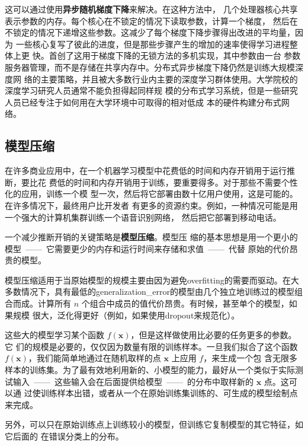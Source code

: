 这可以通过使用\textbf{异步随机梯度下降}\citep{NIPS2011_4390}来解决。在这种方法中，
几个处理器核心共享表示参数的内存。每个核心在不锁定的情况下读取参数，计算一个梯度，
然后在不锁定的情况下递增这些参数。这减少了每个梯度下降步骤得出改进的平均量，因为
一些核心复写了彼此的进度，但是那些步骤产生的增加的速率使得学习进程整体上更
快。\citet{NIPS2012_4687}首创了这用于梯度下降的无锁方法的多机实现，其中参数由一台
参数服务器管理，而不是存储在共享内存中。分布式异步梯度下降仍然是训练大规模深度网
络的主要策略，并且被大多数行业内主要的深度学习群体使用\citep{186212,
  DBLP:journals/corr/WuYSDS15}。大学院校的深度学习研究人员通常不能负担得起同样规
模的分布式学习系统，但是一些研究人员已经专注于如何用在大学环境中可取得的相对低成
本的硬件构建分布式网络\citep{coates2013deep}。

\subsection{模型压缩}
\label{subsec:model_compression}

在许多商业应用中，在一个机器学习模型中花费低的时间和内存开销用于运行推断，要比花
费低的时间和内存开销用于训练，要重要得多。对于那些不需要个性化的应用，训练一个模
型一次，然后将它部署由数十亿用户使用，这是可能的。在许多情况下，最终用户比开发者
有更多的资源约束。例如，一种情况可能是用一个强大的计算机集群训练一个语音识别网络，
然后把它部署到移动电话。

一个减少推断开销的关键策略是\textbf{模型压缩}\citep{Ungar:2006:1150402}。模型压
缩的基本思想是用一个更小的模型~——~它需要更少的内存和运行时间来存储和求值~——~代替
原始的代价昂贵的模型。

模型压缩适用于当原始模型的规模主要由因为避免\gls{overfitting}的需要而驱动。在大
多数情况下，具有最低的\gls{generalization_error}的模型由几个独立地训练过的模型组
合而成。计算所有 $n$ 个组合中成员的值代价昂贵。有时候，甚至单个的模型，如果规模
很大，泛化得更好（例如，如果使用\gls{dropout}来规范化）。

这些大的模型学习某个函数 $f(\pmb{x})$，但是这样做使用比必要的任务更多的参数。它
们的规模是必要的，仅仅因为数量有限的训练样本。一旦我们拟合了这个函数
$f(\pmb{x})$，我们能简单地通过在随机取样的点 $\pmb{x}$ 上应用 $f$，来生成一个包
含无限多样本的训练集。为了最有效地利用新的、小模型的能力，最好从一个类似于实际测
试输入~——~这些输入会在后面提供给模型~——~的分布中取样新的 $\pmb{x}$ 点。这可以通
过使训练样本出错，或者从一个在原始训练集训练的、可生成的模型绘制点来完成。

另外，可以只在原始训练点上训练较小的模型，但训练它复制模型的其它特征，如它后面的
在错误分类上的分布。

